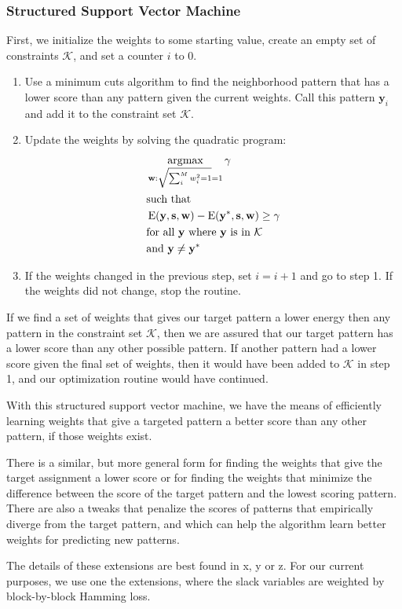 \subsubsection*{Structured Support Vector Machine}
First, we initialize the weights to some starting value, create an
empty set of constraints $\mathcal{K}$, and set a counter $i$ to $0$.
\begin{enumerate}
\item Use a minimum cuts algorithm to find the neighborhood pattern
  that has a lower score than any pattern given the current weights.
  Call this pattern $\mathbf{y}_i$ and add it to the constraint
  set $\mathcal{K}$.

\item Update the weights by solving the quadratic program: 
%
\begin{align*}
&\operatorname*{\arg\!\max}_{\mathbf{w}:\sqrt{\sum_i^M w_i^2 = 1}=1} \mathbf{\gamma} \\
&\text{such that} \\
&\operatorname{E}(\mathbf{y}, \mathbf{s}, \mathbf{w})
- \operatorname{E}(\mathbf{y}^*, \mathbf{s}, \mathbf{w}) \geq \gamma\\ 
&\text{for all } \mathbf{y} \text{ where } \mathbf{y} \text{ is in } \mathcal{K}\\
&\text{and } \mathbf{y} \neq \mathbf{y}^*
\end{align*}
%

\item If the weights changed in the previous step, set $i = i + 1$ and
  go to step 1. If the weights did not change, stop the routine.
\end{enumerate}

If we find a set of weights that gives our target pattern a lower
energy then any pattern in the constraint set $\mathcal{K}$, then we
are assured that our target pattern has a lower score than any other
possible pattern. If another pattern had a lower score given the final
set of weights, then it would have been added to $\mathcal{K}$ in step
1, and our optimization routine would have continued. 

With this structured support vector machine, we have the means of
efficiently learning weights that give a targeted pattern a better
score than any other pattern, if those weights exist. 

There is a similar, but more general form for finding the weights that
give the target assignment a lower score or for finding the weights
that minimize the difference between the score of the target pattern
and the lowest scoring pattern. There are also a tweaks that penalize
the scores of patterns that empirically diverge from the target
pattern, and which can help the algorithm learn better weights for
predicting new patterns. 

The details of these extensions are best found in x, y or z. For our
current purposes, we use one the extensions, where the slack variables
are weighted by block-by-block Hamming loss.
